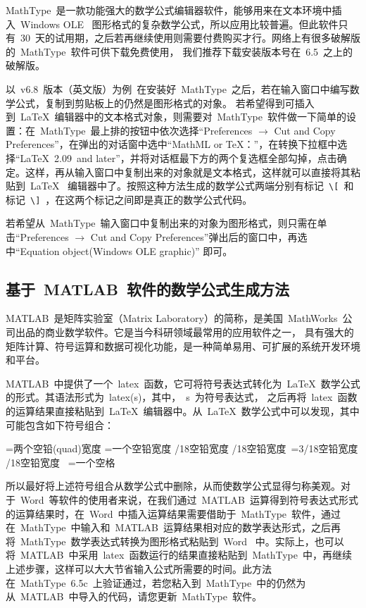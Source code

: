 MathType~是一款功能强大的数学公式编辑器软件，能够用来在文本环境中插入~Windows OLE~ 图形格式的复杂数学公式，所以应用比较普遍。但此软件只有~30~天的试用期，之后若再继续使用则需要付费购买才行。网络上有很多破解版的~MathType~软件可供下载免费使用，
我们推荐下载安装版本号在~6.5~之上的破解版。

以~v6.8~版本（英文版）为例~在安装好~MathType~之后，若在输入窗口中编写数学公式，复制到剪贴板上的仍然是图形格式的对象。
若希望得到可插入到~\LaTeX~编辑器中的文本格式对象，则需要对~MathType~软件做一下简单的设置：在~MathType~最上排的按钮中依次选择“Preferences
$\rightarrow$ Cut and Copy Preferences”，在弹出的对话窗中选中“MathML or TeX：”，在转换下拉框中选择“LaTeX~2.09~and later”，并将对话框最下方的两个复选框全部勾掉，点击确定。这样，再从输入窗口中复制出来的对象就是文本格式，这样就可以直接将其粘贴到~\LaTeX~
编辑器中了。按照这种方法生成的数学公式两端分别有标记~\verb|\[|~和标记~\verb|\]|~，在这两个标记之间即是真正的数学公式代码。

若希望从~MathType~输入窗口中复制出来的对象为图形格式，则只需在单击“Preferences
$\rightarrow$ Cut and Copy Preferences”弹出后的窗口中，再选中“Equation object(Windows OLE graphic)” 即可。

\subsection{基于~MATLAB~软件的数学公式生成方法}


MATLAB~是矩阵实验室（Matrix Laboratory）的简称，是美国~MathWorks~公司出品的商业数学软件。它是当今科研领域最常用的应用软件之一，
具有强大的矩阵计算、符号运算和数据可视化功能，是一种简单易用、可扩展的系统开发环境和平台。


MATLAB~中提供了一个~latex~函数，它可将符号表达式转化为~\LaTeX~数学公式的形式。其语法形式为~latex(s)，其中，~s~为符号表达式，
之后再将~latex~函数的运算结果直接粘贴到~\LaTeX~编辑器中。从~\LaTeX~数学公式中可以发现，其中可能包含如下符号组合：

\begin{verbatim*}
\qquad=两个空铅(quad)宽度
\quad=一个空铅宽度
/18空铅宽度
/18空铅宽度
\,=3/18空铅宽度
/18空铅宽度
\ =一个空格
\end{verbatim*}

所以最好将上述符号组合从数学公式中删除，从而使数学公式显得匀称美观。对于~Word~等软件的使用者来说，在我们通过~MATLAB~运算得到符号表达式形式的运算结果时，在~Word~中插入运算结果需要借助于~MathType~软件，通过在~MathType~中输入和~MATLAB~运算结果相对应的数学表达形式，之后再将~MathType~数学表达式转换为图形格式粘贴到~Word~ 中。实际上，也可以将~MATLAB~中采用~latex~函数运行的结果直接粘贴到~MathType~中，再继续上述步骤，这样可以大大节省输入公式所需要的时间。此方法在~MathType~6.5c~上验证通过，若您粘入到~MathType~中的仍然为从~MATLAB~中导入的代码，请您更新~MathType~软件。

